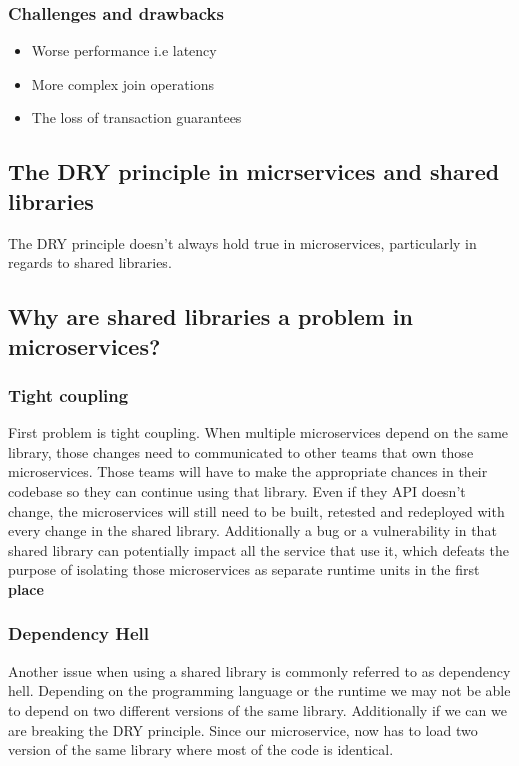 \subsubsection{Challenges and drawbacks}
\begin{itemize}
    \item Worse performance i.e latency
    \item More complex join operations
    \item The loss of transaction guarantees
\end{itemize}

\subsection{The DRY principle in micrservices and shared libraries}
The DRY principle doesn't always hold true in microservices, particularly in regards to shared libraries.

\subsection{Why are shared libraries a problem in microservices?}

\subsubsection{Tight coupling}
First problem is tight coupling.
When multiple microservices depend on the same library, those changes need to communicated to other teams that own those microservices.
Those teams will have to make the appropriate chances in their codebase so they can continue using that library.
Even if they API doesn't change, the microservices will still need to be built, retested and redeployed with every change in the shared library.
Additionally a bug or a vulnerability in that shared library can potentially impact all the service that use it, which defeats the purpose of isolating those microservices as separate runtime units in the first \textbf{place}

\subsubsection{Dependency Hell}
Another issue when using a shared library is commonly referred to as dependency hell.
Depending on the programming language or the runtime we may not be able to depend on two different versions of the same library.
Additionally if we can we are breaking the DRY principle.
Since our microservice, now has to load two version of the same library where most of the code is identical.

